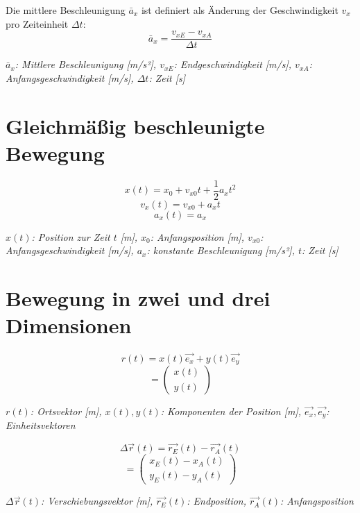 \documentclass[a5paper,10pt]{article}
\newenvironment{displayformula}
{
	\begin{framed}
		\color{formulaColor}
	}
	{\end{framed}}
\newcommand{\formulalegend}[1]{%
	\par\vspace{0.5ex}%
	{{\color{legendColor}\RaggedRight\small\textit{#1}}}%
	\par\vspace{1.5ex}%
}
\begin{document}
\begin{displayformula}
	Die mittlere Beschleunigung \( \bar{a}_x \) ist definiert als Änderung der Geschwindigkeit \( v_x \) pro Zeiteinheit \( \Delta t \):
	\[
	\bar{a}_x = \frac{v_{xE} - v_{xA}}{\Delta t}
	\]
\end{displayformula}
\formulalegend{
	\( \bar{a}_x \): Mittlere Beschleunigung [m/s²], \( v_{xE} \): Endgeschwindigkeit [m/s], \( v_{xA} \): Anfangsgeschwindigkeit [m/s], \( \Delta t \): Zeit [s]
}

\newpage

\section{Gleichmäßig beschleunigte Bewegung}

\begin{displayformula}
	\[
	x(t) = x_0 + v_{x0}t + \frac{1}{2} a_x t^2 
	\]
	\[
	v_x(t) = v_{x0} + a_x t
	\]
	\[
	a_x(t) = a_x
	\]
\end{displayformula}
\formulalegend{
	\( x(t) \): Position zur Zeit \( t \) [m], \( x_0 \): Anfangsposition [m], \( v_{x0} \): Anfangsgeschwindigkeit [m/s], \( a_x \): konstante Beschleunigung [m/s²], \( t \): Zeit [s]
}

\section{Bewegung in zwei und drei Dimensionen}

\begin{displayformula}
	\[
	r(t) = x(t)\vec{e_x} + y(t)\vec{e_y}
	\]
	\[
	= \begin{pmatrix}
		x(t) \\
		y(t)
	\end{pmatrix}
	\]
\end{displayformula}
\formulalegend{
	\( r(t) \): Ortsvektor [m], \( x(t), y(t) \): Komponenten der Position [m], \( \vec{e_x}, \vec{e_y} \): Einheitsvektoren
}

\begin{displayformula}
	\[
	\Delta \vec{r}(t) = \vec{r_E}(t) - \vec{r_A}(t)
	\]
	\[
	= \begin{pmatrix}
		x_E(t) - x_A(t) \\
		y_E(t) - y_A(t)
	\end{pmatrix}
	\]
\end{displayformula}
\formulalegend{
	\( \Delta \vec{r}(t) \): Verschiebungsvektor [m], \( \vec{r_E}(t) \): Endposition, \( \vec{r_A}(t) \): Anfangsposition
}
\end{document}

